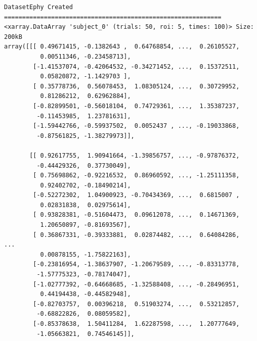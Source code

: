\documentclass[
  11pt,
  letterpaper,
  oneside,
  openany]{book}
\begin{document}
\begin{verbatim}
DatasetEphy Created
============================================================
<xarray.DataArray 'subject_0' (trials: 50, roi: 5, times: 100)> Size: 200kB
array([[[ 0.49671415, -0.1382643 ,  0.64768854, ...,  0.26105527,
          0.00511346, -0.23458713],
        [-1.41537074, -0.42064532, -0.34271452, ...,  0.15372511,
          0.05820872, -1.1429703 ],
        [ 0.35778736,  0.56078453,  1.08305124, ...,  0.30729952,
          0.81286212,  0.62962884],
        [-0.82899501, -0.56018104,  0.74729361, ...,  1.35387237,
         -0.11453985,  1.23781631],
        [-1.59442766, -0.59937502,  0.0052437 , ..., -0.19033868,
         -0.87561825, -1.38279973]],

       [[ 0.92617755,  1.90941664, -1.39856757, ..., -0.97876372,
         -0.44429326,  0.37730049],
        [ 0.75698862, -0.92216532,  0.86960592, ..., -1.25111358,
          0.92402702, -0.18490214],
        [-0.52272302,  1.04900923, -0.70434369, ...,  0.6815007 ,
          0.02831838,  0.02975614],
        [ 0.93828381, -0.51604473,  0.09612078, ...,  0.14671369,
          1.20650897, -0.81693567],
        [ 0.36867331, -0.39333881,  0.02874482, ...,  0.64084286,
...
          0.00878155, -1.75822163],
        [-0.23816954, -1.38637907, -1.20679589, ..., -0.83313778,
         -1.57775323, -0.78174047],
        [-1.02777392, -0.64668685, -1.32588408, ..., -0.28496951,
          0.44194438, -0.44582948],
        [-0.82703757,  0.00396218,  0.51903274, ...,  0.53212857,
         -0.68822826,  0.08059582],
        [-0.85378638,  1.50411284,  1.62287598, ...,  1.20777649,
         -1.05663821,  0.74546145]],


\end{verbatim}
\end{document}
